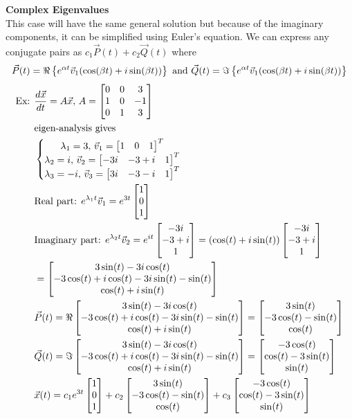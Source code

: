 \documentclass[11pt, fleqn]{article}
\begin{document}
\textbf{Complex Eigenvalues}\\
This case will have the same general solution but because of the imaginary components, it can be simplified using Euler's equation. We can express any conjugate pairs as $c_1\vec{P}(t)+c_2\vec{Q}(t)$ where
$$\vec{P}(t)=\Re\left\{ e^{\alpha t}\vec{v}_1(\cos(\beta t)+i\sin(\beta t)) \right\}\text{ and }\vec{Q}(t)=\Im\left\{ e^{\alpha t}\vec{v}_1(\cos(\beta t)+i\sin(\beta t)) \right\}$$
\begin{align*}
    \text{Ex: }&\frac{d\vec{x}}{dt}=A\vec{x},\,A=\matrixx{0&0&3\\1&0&-1\\0&1&3}\\
    &\text{eigen-analysis gives}\\
    &\eqnsystem{\lambda_1=3,\,\vec{v}_1=\matrixx{1&0&1}^T\\\lambda_2=i,\,\vec{v}_2=\matrixx{-3i&-3+i&1}^T\\\lambda_3=-i,\,\vec{v}_3=\matrixx{3i&-3-i&1}^T}\\
    &\text{Real part: }e^{\lambda_1t}\vec{v}_1=e^{3t}\matrixx{1\\0\\1}\\
    &\text{Imaginary part: }e^{\lambda_2t}\vec{v}_2=e^{it}\matrixx{-3i\\-3+i\\1}=(\cos(t)+i\sin(t))\matrixx{-3i\\-3+i\\1}\\
    &=\matrixx{3\sin(t)-3i\cos(t)\\-3\cos(t)+i\cos(t)-3i\sin(t)-\sin(t)\\\cos(t)+i\sin(t)}\\
    &\vec{P}(t)=\Re\matrixx{3\sin(t)-3i\cos(t)\\-3\cos(t)+i\cos(t)-3i\sin(t)-\sin(t)\\\cos(t)+i\sin(t)}=\matrixx{3\sin(t)\\-3\cos(t)-\sin(t)\\\cos(t)}\\
    &\vec{Q}(t)=\Im\matrixx{3\sin(t)-3i\cos(t)\\-3\cos(t)+i\cos(t)-3i\sin(t)-\sin(t)\\\cos(t)+i\sin(t)}=\matrixx{-3\cos(t)\\\cos(t)-3\sin(t)\\\sin(t)}\\
    &\vec{x}(t)=c_1e^{3t}\matrixx{1\\0\\1}+c_2\matrixx{3\sin(t)\\-3\cos(t)-\sin(t)\\\cos(t)}+c_3\matrixx{-3\cos(t)\\\cos(t)-3\sin(t)\\\sin(t)}
\end{align*}
\end{document}
